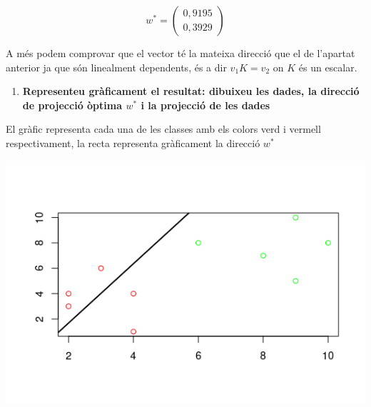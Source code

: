 \documentclass[a4paper]{article}
\begin{document}
$$
w^* = 
\begin{pmatrix}
0,9195 \\
 0,3929
\end{pmatrix}
$$

A més podem comprovar que el vector té la mateixa direcció que el de l'apartat anterior ja que són linealment dependents, és a dir $v_1K = v_2$ on $K$ és un escalar.



\begin{enumerate}[resume=main]
	\item \textbf{Representeu gràficament el resultat: dibuixeu les dades, la direcció de projecció òptima $w^*$ i la projecció de les dades}
\end{enumerate}

El gràfic representa cada una de les classes amb els colors verd i vermell respectivament, la recta representa gràficament la direcció $w^*$

\includegraphics[scale=0.5]{plot}\centering
\end{document}
